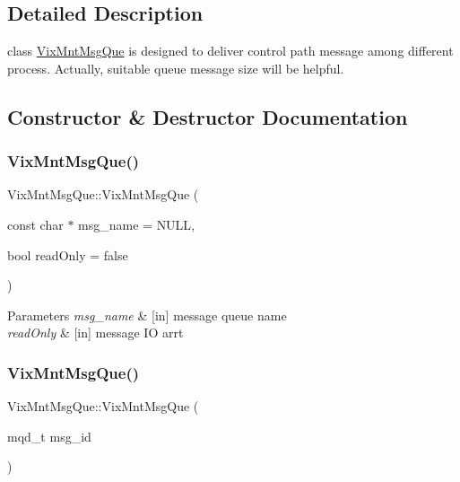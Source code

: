 \subsection{Detailed Description}
class \hyperlink{class_vix_mnt_msg_que}{Vix\+Mnt\+Msg\+Que} is designed to deliver control path message among different process. Actually, suitable queue message size will be helpful. 

\subsection{Constructor \& Destructor Documentation}
\hypertarget{class_vix_mnt_msg_que_a8b8ee1d568633d791ab05474ebf49139}{}\label{class_vix_mnt_msg_que_a8b8ee1d568633d791ab05474ebf49139} 
\subsubsection{\texorpdfstring{Vix\+Mnt\+Msg\+Que()}{VixMntMsgQue()}\hspace{0.1cm}{\footnotesize\ttfamily [1/2]}}
{\ttfamily Vix\+Mnt\+Msg\+Que\+::\+Vix\+Mnt\+Msg\+Que (\begin{DoxyParamCaption}\item[{const char $\ast$}]{msg\+\_\+name = {\ttfamily NULL},  }\item[{bool}]{read\+Only = {\ttfamily false} }\end{DoxyParamCaption})\hspace{0.3cm}{\ttfamily [explicit]}}


\begin{DoxyParams}{Parameters}
{\em msg\+\_\+name} & \mbox{[}in\mbox{]} message queue name \\
\hline
{\em read\+Only} & \mbox{[}in\mbox{]} message IO arrt \\
\hline
\end{DoxyParams}
\hypertarget{class_vix_mnt_msg_que_a5ad26c6043aa804ac1358568e76f6f62}{}\label{class_vix_mnt_msg_que_a5ad26c6043aa804ac1358568e76f6f62} 
\subsubsection{\texorpdfstring{Vix\+Mnt\+Msg\+Que()}{VixMntMsgQue()}\hspace{0.1cm}{\footnotesize\ttfamily [2/2]}}
{\ttfamily Vix\+Mnt\+Msg\+Que\+::\+Vix\+Mnt\+Msg\+Que (\begin{DoxyParamCaption}\item[{mqd\+\_\+t}]{msg\+\_\+id }\end{DoxyParamCaption})\hspace{0.3cm}{\ttfamily [explicit]}}



